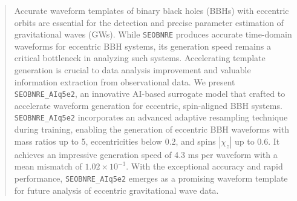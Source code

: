 \documentclass[
reprint,
superscriptaddress,
amsmath,amssymb,
aps,
prd,
floatfix,
]{revtex4-2}
\begin{document}
\begin{abstract}
Accurate waveform templates of binary black holes (BBHs) with eccentric orbits are essential for the detection and precise parameter estimation of gravitational waves (GWs).
While \texttt{SEOBNRE} produces accurate time-domain waveforms for eccentric BBH systems, its generation speed remains a critical bottleneck in analyzing such systems. 
Accelerating template generation is crucial to data analysis improvement and valuable information extraction from observational data.
We present \texttt{SEOBNRE\_AIq5e2}, an innovative AI-based surrogate model that crafted to accelerate waveform generation for eccentric, spin-aligned BBH systems. %
\texttt{SEOBNRE\_AIq5e2} incorporates an advanced adaptive resampling technique during training, enabling the generation of eccentric BBH waveforms with mass ratios up to 5, eccentricities below 0.2, and spins $|\chi_z|$ up to 0.6. 
It achieves an impressive generation speed of 4.3 ms per waveform with a mean mismatch of $1.02 \times 10^{-3}$. 
With the exceptional accuracy and rapid performance, \texttt{SEOBNRE\_AIq5e2} emerges as a promising waveform template for future analysis of eccentric gravitational wave data.

\end{abstract}
\maketitle
\end{document}
